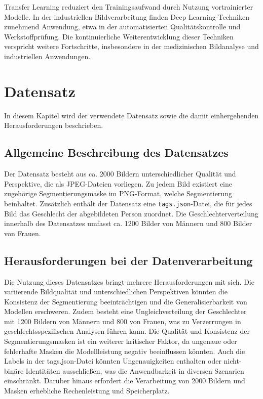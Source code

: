 \documentclass[journal,twoside,web]{ieeecolor}
\begin{document}
Transfer Learning reduziert den Trainingsaufwand durch Nutzung vortrainierter Modelle.
In der industriellen Bildverarbeitung finden Deep Learning-Techniken zunehmend Anwendung, etwa in der automatisierten Qualitätskontrolle und Werkstoffprüfung.
Die kontinuierliche Weiterentwicklung dieser Techniken verspricht weitere Fortschritte, insbesondere in der medizinischen Bildanalyse und industriellen Anwendungen.


\section{Datensatz} \label{sec:dataset}
In diesem Kapitel wird der verwendete Datensatz sowie die damit einhergehenden Herausforderungen beschrieben.

\subsection{Allgemeine Beschreibung des Datensatzes}
\label{sec:dataset_description}
Der Datensatz besteht aus ca. 2000 Bildern unterschiedlicher Qualität und Perspektive, die als JPEG-Dateien vorliegen. Zu jedem Bild existiert eine zugehörige Segmentierungsmaske im PNG-Format, welche Segmentierung beinhaltet. Zusätzlich enthält der Datensatz eine \texttt{tags.json}-Datei, die für jedes Bild das Geschlecht der abgebildeten Person zuordnet. Die Geschlechterverteilung innerhalb des Datensatzes umfasst ca. 1200 Bilder von Männern und 800 Bilder von Frauen.

\subsection{Herausforderungen bei der Datenverarbeitung}  
Die Nutzung dieses Datensatzes bringt mehrere Herausforderungen mit sich. Die variierende Bildqualität und unterschiedlichen Perspektiven könnten die Konsistenz der Segmentierung beeinträchtigen und die Generalisierbarkeit von Modellen erschweren. Zudem besteht eine Ungleichverteilung der Geschlechter mit 1200 Bildern von Männern und 800 von Frauen, was zu Verzerrungen in geschlechtsspezifischen Analysen führen kann. Die Qualität und Konsistenz der Segmentierungsmasken ist ein weiterer kritischer Faktor, da ungenaue oder fehlerhafte Masken die Modellleistung negativ beeinflussen könnten. Auch die Labels in der tags.json-Datei könnten Ungenauigkeiten enthalten oder nicht-binäre Identitäten ausschließen, was die Anwendbarkeit in diversen Szenarien einschränkt. Darüber hinaus erfordert die Verarbeitung von 2000 Bildern und Masken erhebliche Rechenleistung und Speicherplatz. 
\end{document}
